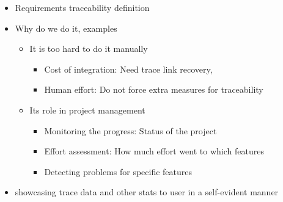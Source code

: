 \documentclass[conference]{IEEEtran}
\begin{document}
\begin{itemize}
    \item Requirements traceability definition
    \item Why do we do it, examples
    \begin{itemize}
        \item It is too hard to do it manually
        \begin{itemize}
            \item Cost of integration: Need trace link recovery, 
            \item Human effort: Do not force extra measures for traceability
        \end{itemize}
        \item Its role in project management
        \begin{itemize}
            \item Monitoring the progress: Status of the project
            \item Effort assessment: How much effort went to which features
            \item Detecting problems for specific features
        \end{itemize}
    \end{itemize}
    \item showcasing trace data and other stats to user in a self-evident manner
\end{itemize}


\end{document}
